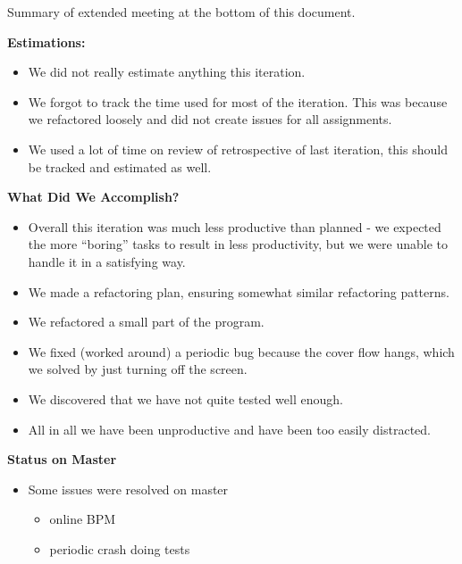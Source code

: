 Summary of extended meeting at the bottom of this document.

\textbf{Estimations:}
\begin{itemize}
\item We did not really estimate anything this iteration.
\item We forgot to track the time used for most of the iteration. This was because we refactored loosely and did not create issues for all assignments.
\item We used a lot of time on review of retrospective of last iteration, this should be tracked and estimated as well.
\end{itemize}


\textbf{What Did We Accomplish?}
\begin{itemize}
\item Overall this iteration was much less productive than planned - we expected the more “boring” tasks to result in less productivity, but we were unable to handle it in a satisfying way.
\item We made a refactoring plan, ensuring somewhat similar refactoring patterns.
\item We refactored a small part of the program.
\item We fixed (worked around) a periodic bug because the cover flow hangs, which we solved by just turning off the screen. 
\item We discovered that we have not quite tested well enough. 
\item All in all we have been unproductive and have been too easily distracted.
\end{itemize}


\textbf{Status on Master}
\begin{itemize}
\item Some issues were resolved on master
\begin{itemize}
\item online BPM
\item periodic crash doing tests
\end{itemize}
\end{itemize}

